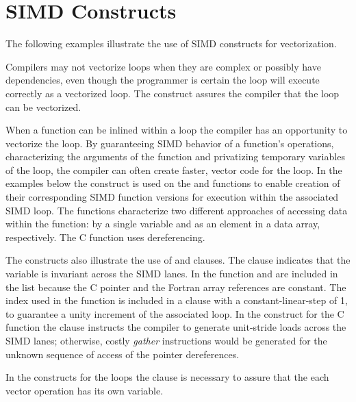 \pagebreak
\section{SIMD Constructs}
\label{sec:SIMD}

The following examples illustrate the use of SIMD constructs for vectorization.

Compilers may not vectorize loops when they are complex or possibly have 
dependencies, even though the programmer is certain the loop will execute 
correctly as a vectorized loop.  The  construct assures the compiler 
that the loop can be vectorized.


 

When a function can be inlined within a loop the compiler has an opportunity to 
vectorize the loop. By guaranteeing SIMD behavior of a function's operations, 
characterizing the arguments of the function and privatizing temporary 
variables of the loop, the compiler can often create faster, vector code for 
the loop. In the examples below the   construct is 
used on the  and  functions to enable creation of their 
corresponding SIMD function versions for execution within the associated SIMD 
loop. The functions characterize two different approaches of accessing data 
within the function: by a single variable and as an element in a data array, 
respectively. The  C function uses dereferencing.

The   constructs also illustrate the use of 
 and  clauses.  The  clause 
indicates that the variable  is invariant across the SIMD lanes. In 
the  function  and  are included in the  
list because the C pointer and the Fortran array references are constant.  The 
 index used in the  function is included in a  
clause with a constant-linear-step of 1, to guarantee a unity increment of the 
associated loop. In the   construct for the  
C function the   clause instructs the compiler to generate 
unit-stride loads across the SIMD lanes; otherwise,  costly \emph{gather} 
instructions would be generated for the unknown sequence of access of the 
pointer dereferences.

In the  constructs for the loops the  clause is 
necessary to assure that the each vector operation has its own  
variable.

